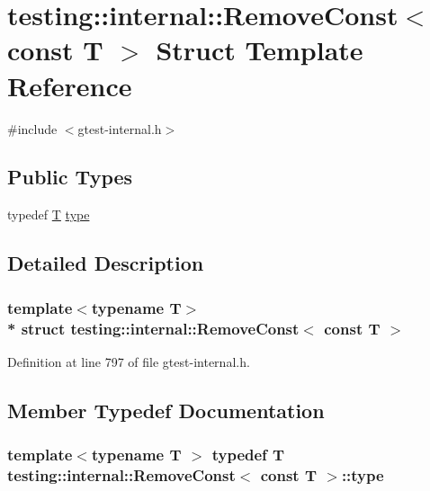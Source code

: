 \hypertarget{structtesting_1_1internal_1_1_remove_const_3_01const_01_t_01_4}{}\section{testing\+:\+:internal\+:\+:Remove\+Const$<$ const T $>$ Struct Template Reference}
\label{structtesting_1_1internal_1_1_remove_const_3_01const_01_t_01_4}


{\ttfamily \#include $<$gtest-\/internal.\+h$>$}

\subsection*{Public Types}
\begin{DoxyCompactItemize}
\item 
typedef \hyperlink{functions__7_8js_adf1f3edb9115acb0a1e04209b7a9937b}{T} \hyperlink{structtesting_1_1internal_1_1_remove_const_3_01const_01_t_01_4_ac88c6824d228ab05091e5a4f1c1a95fc}{type}
\end{DoxyCompactItemize}


\subsection{Detailed Description}
\subsubsection*{template$<$typename T$>$\\*
struct testing\+::internal\+::\+Remove\+Const$<$ const T $>$}



Definition at line 797 of file gtest-\/internal.\+h.



\subsection{Member Typedef Documentation}
\subsubsection[{\texorpdfstring{type}{type}}]{\setlength{\rightskip}{0pt plus 5cm}template$<$typename T $>$ typedef {\bf T} {\bf testing\+::internal\+::\+Remove\+Const}$<$ const {\bf T} $>$\+::{\bf type}}\hypertarget{structtesting_1_1internal_1_1_remove_const_3_01const_01_t_01_4_ac88c6824d228ab05091e5a4f1c1a95fc}{}\label{structtesting_1_1internal_1_1_remove_const_3_01const_01_t_01_4_ac88c6824d228ab05091e5a4f1c1a95fc}


